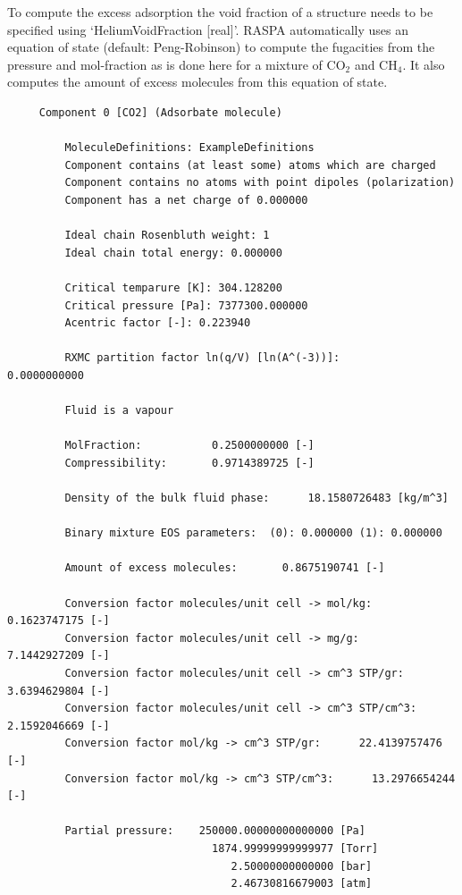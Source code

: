 To compute the excess adsorption the void fraction of a structure needs to be specified using `HeliumVoidFraction [real]'. RASPA automatically uses an
equation of state (default: Peng-Robinson) to compute the fugacities from the pressure and mol-fraction as is done here for a mixture of CO$_2$ and CH$_4$.
It also computes the amount of excess molecules from this equation of state.
\begin{tiny}
\begin{verbatim}
     Component 0 [CO2] (Adsorbate molecule)
     
         MoleculeDefinitions: ExampleDefinitions
         Component contains (at least some) atoms which are charged
         Component contains no atoms with point dipoles (polarization)
         Component has a net charge of 0.000000
     
         Ideal chain Rosenbluth weight: 1
         Ideal chain total energy: 0.000000
     
         Critical temparure [K]: 304.128200
         Critical pressure [Pa]: 7377300.000000
         Acentric factor [-]: 0.223940
     
         RXMC partition factor ln(q/V) [ln(A^(-3))]:       0.0000000000
     
         Fluid is a vapour
     
         MolFraction:           0.2500000000 [-]
         Compressibility:       0.9714389725 [-]
     
         Density of the bulk fluid phase:      18.1580726483 [kg/m^3]
     
         Binary mixture EOS parameters:  (0): 0.000000 (1): 0.000000
     
         Amount of excess molecules:       0.8675190741 [-]
     
         Conversion factor molecules/unit cell -> mol/kg:       0.1623747175 [-]
         Conversion factor molecules/unit cell -> mg/g:       7.1442927209 [-]
         Conversion factor molecules/unit cell -> cm^3 STP/gr:       3.6394629804 [-]
         Conversion factor molecules/unit cell -> cm^3 STP/cm^3:       2.1592046669 [-]
         Conversion factor mol/kg -> cm^3 STP/gr:      22.4139757476 [-]
         Conversion factor mol/kg -> cm^3 STP/cm^3:      13.2976654244 [-]
     
         Partial pressure:    250000.00000000000000 [Pa]
                                1874.99999999999977 [Torr]
                                   2.50000000000000 [bar]
                                   2.46730816679003 [atm]
     

\end{verbatim}
\end{tiny}
